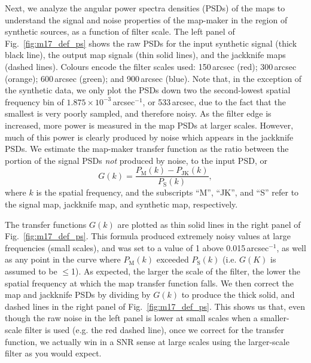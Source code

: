 \documentclass[useAMS,usenatbib,nofootinbib]{mn2e}
\begin{document}
Next, we analyze the angular power spectra densities (PSDs) of the
maps to understand the signal and noise properties of the map-maker in
the region of synthetic sources, as a function of filter scale. The
left panel of Fig.~\ref{fig:m17_def_ps} shows the raw PSDs for the
input synthetic signal (thick black line), the output map signals
(thin solid lines), and the jackknife maps (dashed lines). Colours
encode the filter scales used: 150\,arcsec (red); 300\,arcsec
(orange); 600\,arcsec (green); and 900\,arcsec (blue). Note that, in
the exception of the synthetic data, we only plot the PSDs down two
the second-lowest spatial frequency bin of
$1.875\times10^{-3}$\,arcsec$^{-1}$, or 533\,arcsec, due to the fact
that the smallest is very poorly sampled, and therefore noisy. As the
filter edge is increased, more power is measured in the map PSDs at
larger scales. However, much of this power is clearly produced by
noise which appears in the jackknife PSDs. We estimate the map-maker
transfer function as the ratio between the portion of the signal PSDs
\emph{not} produced by noise, to the input PSD, or
%
\begin{equation}
G(k) = \frac{P_\mathrm{M}(k) - P_\mathrm{JK}(k)}{P_\mathrm{S}(k)},
\end{equation}
%
where $k$ is the spatial frequency, and the subscripts ``M'', ``JK'',
and ``S'' refer to the signal map, jackknife map, and synthetic map,
respectively.

The transfer functions $G(k)$ are plotted as thin solid lines in the
right panel of Fig.~\ref{fig:m17_def_ps}. This formula produced
extremely noisy values at large frequencies (small scales), and was
set to a value of 1 above 0.015\,arcsec$^{-1}$, as well as any point
in the curve where $P_\mathrm{M}(k)$ exceeded $P_\mathrm{S}(k)$
(i.e. $G(K)$ is assumed to be $\le$1). As expected, the larger the
scale of the filter, the lower the spatial frequency at which the map
transfer function falls. We then correct the map and jackknife PSDs by
dividing by $G(k)$ to produce the thick solid, and dashed lines in the
right panel of Fig.~\ref{fig:m17_def_ps}. This shows us that, even
though the raw noise in the left panel is lower at small scales when a
smaller-scale filter is used (e.g. the red dashed line), once we
correct for the transfer function, we actually win in a SNR sense at
large scales using the larger-scale filter as you would expect.
\end{document}
